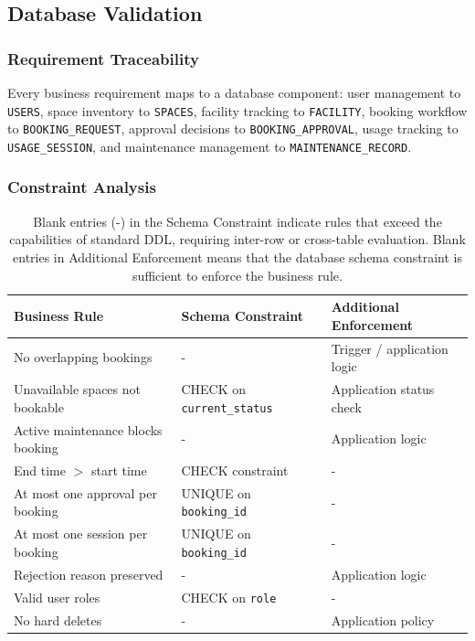 \subsection{Database Validation}

\subsubsection{Requirement Traceability}

Every business requirement maps to a database component:
user management to \texttt{USERS},
space inventory to \texttt{SPACES},
facility tracking to \texttt{FACILITY},
booking workflow to \texttt{BOOKING\-\_REQUEST},
approval decisions to \texttt{BOOKING\-\_APPROVAL},
usage tracking to \texttt{USAGE\-\_SESSION},
and maintenance management to \texttt{MAINTENANCE\-\_RECORD}.

\subsubsection{Constraint Analysis}

\begin{table}[H]
	\centering
	\begin{tabularx}{\textwidth}{|>{\raggedright\arraybackslash}X|>{\raggedright\arraybackslash}X|>{\raggedright\arraybackslash}X|}
		\hline
		\textbf{Business Rule}            & \textbf{Schema Constraint}        & \textbf{Additional Enforcement} \\
		\hline
		No overlapping bookings           & -                                 & Trigger / application logic     \\
		\hline
		Unavailable spaces not bookable   & CHECK on \texttt{current\_status} & Application status check        \\
		\hline
		Active maintenance blocks booking & -                                 & Application logic               \\
		\hline
		End time $>$ start time           & CHECK constraint                  & -                               \\
		\hline
		At most one approval per booking  & UNIQUE on \texttt{booking\_id}    & -                               \\
		\hline
		At most one session per booking   & UNIQUE on \texttt{booking\_id}    & -                               \\
		\hline
		Rejection reason preserved        & -                                 & Application logic               \\
		\hline
		Valid user roles                  & CHECK on \texttt{role}            & -                               \\
		\hline
		No hard deletes                   & -                                 & Application policy              \\
		\hline
	\end{tabularx}
	\caption{Blank entries (-) in the Schema Constraint indicate rules that exceed the capabilities of standard DDL, requiring inter-row or cross-table evaluation. Blank entries in Additional Enforcement means that the database schema constraint is sufficient to enforce the business rule.}
\end{table}

